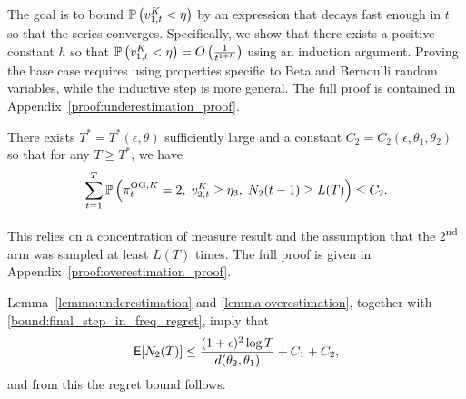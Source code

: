 \begin{myproof}[Proof.]
	\begin{myproof}
		The goal is to bound $\P{v^K_{1,t} < \eta}$ by an expression that decays fast enough in $t$ so that the series converges. Specifically, we show that there exists a positive constant $h$ so that $\P{v^K_{1,t} < \eta} = O\left(\frac{1}{t^{1+h}}\right)$ using an induction argument. Proving the base case requires using properties specific to Beta and Bernoulli random variables, while the inductive step is more general.
		The full proof is contained in Appendix~\ref{proof:underestimation_proof}.
	\end{myproof}
	\begin{lemma} \label{lemma:overestimation}
		There exists $T^* = T^*(\epsilon, \theta)$ sufficiently large and a constant $C_2 = C_2(\epsilon, \theta_1, \theta_2)$ so that for any $T \ge T^*$, we have
		\begin{equation*}
		\sum_{t=1}^T \P{\pi^{{\rm OG},K}_t = 2,\; v^K_{2,t} \ge \eta_3, \; N_2(t-1) \ge L(T)} \le C_2.
		\end{equation*}
	\end{lemma}
	\begin{myproof}
		This relies on a concentration of measure result and the assumption that the 2\textsuperscript{nd} arm was sampled at least $L(T)$ times. The full proof is given in Appendix~\ref{proof:overestimation_proof}.
	\end{myproof}
	Lemma~\ref{lemma:underestimation} and \ref{lemma:overestimation}, together with \eqref{bound:final_step_in_freq_regret}, imply that
	\[
	\E[N_2(T)] \le \frac{(1+\epsilon)^2 \log T}{d(\theta_2, \theta_1)} +  C_1 +  C_2,
	\]
	and from this the regret bound follows.
\end{myproof}
